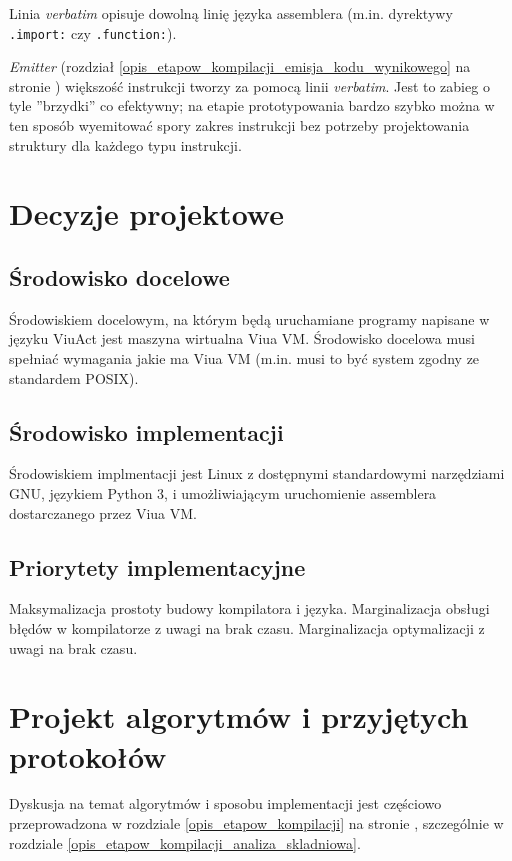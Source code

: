 \documentclass[11pt,oneside,a4paper,titlepage,onecolumn]{article}
\begin{document}
Linia \emph{verbatim} opisuje dowolną linię języka assemblera (m.in. dyrektywy \texttt{.import:} czy
\texttt{.function:}).

\emph{Emitter} (rozdział \ref{opis_etapow_kompilacji_emisja_kodu_wynikowego} na stronie
\pageref{opis_etapow_kompilacji_emisja_kodu_wynikowego}) większość instrukcji tworzy za pomocą linii
\emph{verbatim}. Jest to zabieg o tyle ''brzydki'' co efektywny; na etapie prototypowania bardzo szybko
można w ten sposób wyemitować spory zakres instrukcji bez potrzeby projektowania struktury dla każdego typu
instrukcji.

\newpage
\section{Decyzje projektowe}

\subsection{Środowisko docelowe}

Środowiskiem docelowym, na którym będą uruchamiane programy napisane w języku ViuAct jest maszyna wirtualna
Viua VM. Środowisko docelowa musi spełniać wymagania jakie ma Viua VM (m.in. musi to być system zgodny ze
standardem POSIX).

\subsection{Środowisko implementacji}

Środowiskiem implmentacji jest Linux z dostępnymi standardowymi narzędziami GNU, językiem Python 3, i
umożliwiającym uruchomienie assemblera dostarczanego przez Viua VM.

\subsection{Priorytety implementacyjne}

Maksymalizacja prostoty budowy kompilatora i języka.
Marginalizacja obsługi błędów w kompilatorze z uwagi na brak czasu.
Marginalizacja optymalizacji z uwagi na brak czasu.

\newpage
\section{Projekt algorytmów i przyjętych protokołów}

Dyskusja na temat algorytmów i sposobu implementacji jest częściowo przeprowadzona w rozdziale
\ref{opis_etapow_kompilacji} na stronie \pageref{opis_etapow_kompilacji}, szczególnie w rozdziale
\ref{opis_etapow_kompilacji_analiza_skladniowa}.
\end{document}
